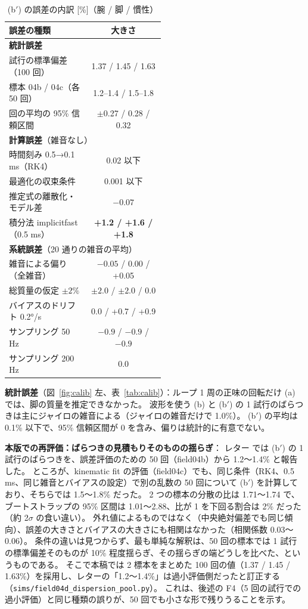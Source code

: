 \documentclass[paper=a4paper,fontsize=10pt,twocolumn,column_gap=2zw,line_length=24zw,number_of_lines=46,head_space=20mm]{jlreq}
\begin{document}
\begin{table}[t]\centering\small
\caption{(b$'$) の誤差の内訳 [\%]（腕 / 脚 / 慣性）}\label{tab:budget}
\setlength{\tabcolsep}{3pt}
\begin{tabular}{p{0.52\linewidth}c}\toprule
誤差の種類 & 大きさ \\\midrule
\multicolumn{2}{l}{\textbf{統計誤差}} \\
\quad 1 試行の標準偏差（100 回） & 1.37 / 1.45 / 1.63 \\
\quad \quad 標本 04b / 04c（各 50 回） & 1.2--1.4 / 1.5--1.8 \\
\quad 100 回の平均の 95\% 信頼区間 & $\pm$0.27 / 0.28 / 0.32 \\
\multicolumn{2}{l}{\textbf{計算誤差}（雑音なし）} \\
\quad 時間刻み 0.5→0.1 ms（RK4） & 0.02 以下 \\
\quad 最適化の収束条件 & 0.001 以下 \\
\quad 推定式の離散化・モデル差 & $-0.07$ \\
\quad 積分法 implicitfast（0.5 ms） & \textbf{+1.2 / +1.6 / +1.8} \\
\multicolumn{2}{l}{\textbf{系統誤差}（20 通りの雑音の平均）} \\
\quad 雑音による偏り（全雑音） & $-0.05$ / 0.00 / +0.05 \\
\quad 総質量の仮定 $\pm2\%$ & $\pm2.0$ / $\pm2.0$ / 0.0 \\
\quad バイアスのドリフト 0.2°/s & 0.0 / +0.7 / +0.9 \\
\quad サンプリング 50 Hz & $-0.9$ / $-0.9$ / $-0.9$ \\
\quad サンプリング 200 Hz & 0.0 \\\bottomrule
\end{tabular}
\end{table}

\textbf{統計誤差}（図~\ref{fig:calib} 左、表~\ref{tab:calib}）：ループ 1 周の正味の回転だけ (a) では、脚の質量を推定できなかった。
波形を使う (b) と (b$'$) の 1 試行のばらつきは主にジャイロの雑音による（ジャイロの雑音だけで 1.0\%）。
(b$'$) の平均は 0.1\% 以下で、95\% 信頼区間が 0 を含み、偏りは統計的に有意でない。

\textbf{本版での再評価：ばらつきの見積もりそのものの揺らぎ}：
レター \cite{letter2026} では (b$'$) の 1 試行のばらつきを、誤差評価のための 50 回（field04b）から 1.2〜1.4\% と報告した。
ところが、kinematic fit の評価（field04c）でも、同じ条件（RK4、0.5 ms、同じ雑音とバイアスの設定）で別の乱数の 50 回について (b$'$) を計算しており、そちらでは 1.5〜1.8\% だった。
2 つの標本の分散の比は 1.71〜1.74 で、ブートストラップの 95\% 区間は 1.01〜2.88、比が 1 を下回る割合は 2\% だった（約 2$\sigma$ の食い違い）。
外れ値によるものではなく（中央絶対偏差でも同じ傾向）、誤差の大きさとバイアスの大きさにも相関はなかった（相関係数 0.03〜0.06）。
条件の違いは見つからず、最も単純な解釈は、50 回の標本では 1 試行の標準偏差そのものが 10\% 程度揺らぎ、その揺らぎの端どうしを比べた、というものである。
そこで本稿では 2 標本をまとめた 100 回の値（1.37 / 1.45 / 1.63\%）を採用し、レターの「1.2〜1.4\%」は過小評価側だったと訂正する（\texttt{sims/field04d\_dispersion\_pool.py}）。
これは、後述の F4（5 回の試行での過小評価）と同じ種類の誤りが、50 回でも小さな形で残りうることを示す。
\end{document}
